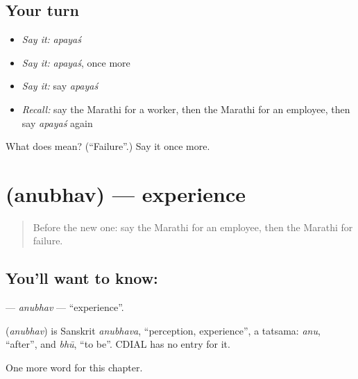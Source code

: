 \subsection*{Your turn}
\begin{itemize}
\raggedright
  \item \emph{Say it:} \emph{apayaś}
  \item \emph{Say it:} \emph{apayaś}, once more
  \item \emph{Say it:} say \emph{apayaś}
  \item \emph{Recall:} say the Marathi for a worker, then the Marathi for an employee, then say \emph{apayaś} again
\end{itemize}

\begin{tcolorbox}[breakable,colback=teal!4,colframe=teal!35!black,title={Before you move on}]
What does  mean? (\textquotedblleft{}Failure\textquotedblright{}.) Say it once more.
\end{tcolorbox}
\section[\texorpdfstring{\mr{अनुभव} (anubhav)}{अनुभव (anubhav)}]{ (anubhav) — experience}

\label{lesson:MR-C211-anubhav}



\begin{quote}
Before the new one: say the Marathi for an employee, then the Marathi for failure.
\end{quote}

\subsection*{You'll want to know: }
\textbf{} — \emph{anubhav} — \textquotedblleft{}experience\textquotedblright{}.

\begin{cousinweb}
\textbf{} (\emph{anubhav}) is Sanskrit \emph{anubhava}, \textquotedblleft{}perception, experience\textquotedblright{}, a tatsama: \emph{anu}, \textquotedblleft{}after\textquotedblright{}, and \emph{bhū}, \textquotedblleft{}to be\textquotedblright{}. CDIAL has no entry for it.
\end{cousinweb}

\begin{grammarlens}[title={What you've built}]
One more word for this chapter.
\end{grammarlens}

